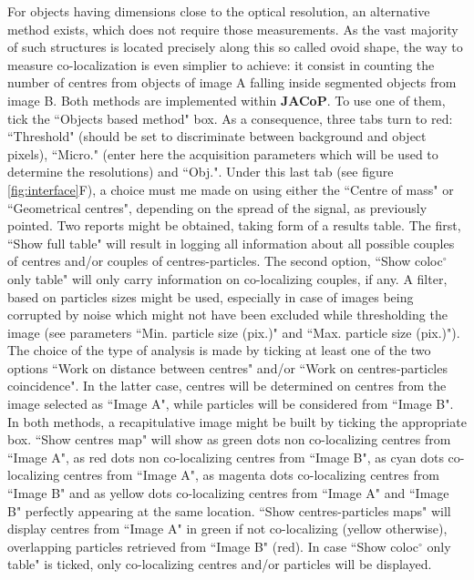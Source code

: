 \documentclass[]{spie}  %
\begin{document}
For objects having dimensions close to the optical resolution, an alternative method exists, which does not require those measurements. As the vast majority of such structures is located  precisely along this so called ovoid shape, the way to measure co-localization is even simplier to achieve: it consist in counting the number of centres from objects of image A falling inside segmented objects from image B.
Both methods are implemented within \textbf{JACoP}. To use one of them, tick the ``Objects based method" box. As a consequence, three tabs turn to red: ``Threshold" (should be set  to discriminate between background and object pixels), ``Micro." (enter here the acquisition parameters which will be used to determine the resolutions) and ``Obj.". Under this last tab (see figure \ref{fig:interface}F), a choice must me made on using either the ``Centre of mass" or ``Geometrical centres", depending on the spread of the signal, as previously pointed. Two reports might be obtained, taking form of a results table. The first, ``Show full table" will result in logging all information about all possible couples of centres and/or couples of centres-particles. The second option, ``Show coloc$^\circ$ only table" will only carry information on co-localizing couples, if any. A filter, based on particles sizes might be used, especially in case of images being corrupted by noise which might not have been excluded while thresholding the image (see parameters ``Min. particle size (pix.)" and ``Max. particle size (pix.)"). The choice of the type of analysis is made by ticking at least one of the two options ``Work on distance between centres" and/or ``Work on centres-particles coincidence". In the latter case, centres will be determined on centres from the image selected as ``Image A", while particles will be considered from ``Image B". In both methods, a recapitulative image might be built by ticking the appropriate box. ``Show centres map" will show as green dots non co-localizing centres from ``Image A", as red dots non co-localizing centres from ``Image B", as cyan dots co-localizing centres from ``Image A", as magenta dots co-localizing centres from ``Image B" and as yellow dots co-localizing centres from ``Image A" and ``Image B" perfectly appearing at the same location. ``Show centres-particles maps" will display centres from ``Image A" in green if not co-localizing (yellow otherwise), overlapping particles retrieved from ``Image B" (red). In case ``Show coloc$^\circ$ only table" is ticked, only co-localizing centres and/or particles will be displayed.
\end{document}
